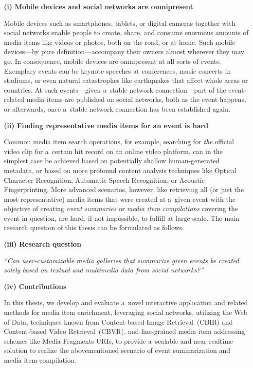 \begin{abstracts}

\textbf{(i) Mobile devices and social networks are omnipresent}

Mobile devices such as smartphones, tablets, or digital cameras
together with social networks enable people to create,
share, and consume enormous amounts of media items
like videos or photos, both on the road, or at home.
Such mobile devices---by pure definition---accompany
their owners almost wherever they may go.
In consequence, mobile devices are omnipresent
at all sorts of events.
Exemplary events can be keynote speeches at conferences,
music concerts in stadiums,
or even natural catastrophes like earthquakes
that affect whole areas or countries.
At such events---given a~stable network connection---part of
the event-related media items are published on social networks,
both as the event happens, or afterwards,
once a~stable network connection has been established again.

\textbf{(ii) Finding representative media items
for an event is hard}

Common media item search operations,
for example, searching for \emph{the} official video clip
for a~certain hit record on an online video platform,
can in the simplest case be achieved based on potentially
shallow human-generated metadata,
or based on more profound content analysis techniques
like Optical Character Recognition,
Automatic Speech Recognition,
or Acoustic Fingerprinting.
More advanced scenarios, however, like retrieving all
(or just the most representative) media items
that were created at a~given event
with the objective of creating \emph{event summaries} or
\emph{media item compilations} covering the event in question,
are hard, if not impossible, to fulfill at large scale.
The main research question of this thesis
can be formulated as follows.

\textbf{(iii) Research question}

\textit{``Can user-customizable media galleries
that summarize given events be\linebreak
created solely based on textual and multimedia data
from social networks?''}

\textbf{(iv) Contributions}

In this thesis, we develop and evaluate
a~novel interactive application and related methods
for media item enrichment,
leveraging social networks, utilizing the Web of Data,
techniques known from Content-based Image Retrieval~(CBIR)
and Content-based Video Retrieval~(CBVR),
and fine-grained media item addressing schemes
like Media Fragments URIs,
to provide a~scalable and near realtime solution
to realize the abovementioned scenario
of event summarization and media item compilation.


\end{abstracts}
